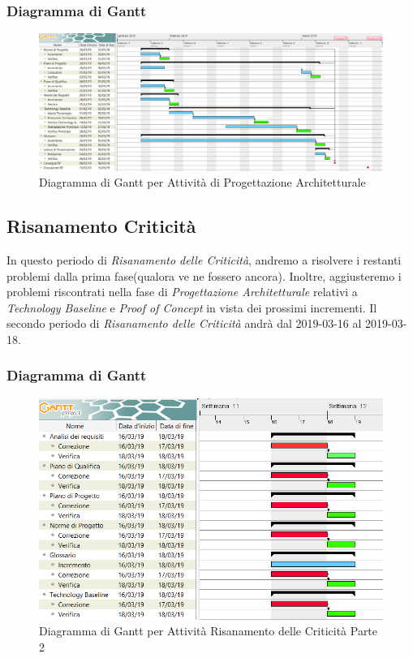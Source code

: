 \begin{landscape}
\subsubsection{Diagramma di Gantt}
\begin{figure}[h]
	\centering
  		\includegraphics[width=1.0\linewidth]{./images/ProgettazioneArchitetturale.png}
  		\caption{Diagramma di Gantt per Attività di Progettazione Architetturale}
  		\label{fig:Gantt Progettazione Architetturale}
\end{figure}
\end{landscape}

\subsection{Risanamento Criticità}
\label{RC2}
In questo periodo di \textit{Risanamento delle Criticità}, andremo a risolvere i restanti problemi dalla prima fase(qualora ve ne fossero ancora). Inoltre, aggiusteremo i problemi riscontrati nella fase di \textit{Progettazione Architetturale} relativi a \textit{Technology Baseline} e \textit{Proof of Concept} in vista dei prossimi incrementi.
Il secondo periodo di \textit{Risanamento delle Criticità} andrà dal 2019-03-16 al 2019-03-18.

\subsubsection{Diagramma di Gantt}

\begin{figure}[h]
	\centering
  		\includegraphics[width=1.0\linewidth]{./images/RisanamentoCriticita2.png}
  		\caption{Diagramma di Gantt per Attività Risanamento delle Criticità Parte 2}
  		\label{fig:Gantt Risananmento Criticità 2}
\end{figure}

